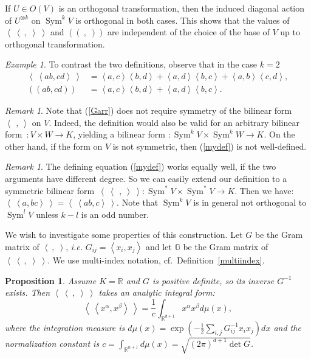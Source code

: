 \documentclass{amsart}
\DeclareMathOperator{\Sym}{Sym}
\newcommand{\ie}{{\it i.e. }}
\newcommand{\bra}{\left<\!\!\!\:\left<}
\newcommand{\ket}{\right>\!\!\!\:\right>}
\newcommand{\G}{\mathbb{G}}
\newcommand{\R}{\mathbb{R}}
\theoremstyle{plain}
\newtheorem{proposition}[theorem]{Proposition}
\theoremstyle{definition}
\theoremstyle{remark}
\newtheorem{remark}[theorem]{Remark}
\newtheorem{example}[theorem]{Example}
\begin{document}
If $U\in O(V)$ is an orthogonal transformation, then the induced diagonal action of $U^{\otimes k}$ on $\Sym^kV$ is orthogonal in both cases. This shows that the values of $\bra\ ,\;\ket$ and $\left(\!\left(\ ,\;\right)\!\right)$ are independent of the choice of the base of $V$ up to orthogonal transformation. 
\begin{example}
To contrast the two definitions, observe that in the case $k=2$
\begin{align}
\bra ab,cd\ket &= \left<a,c\right>\left<b,d\right>+\left<a,d\right>\left<b,c\right> + \left<a,b\right>\left<c,d\right>, \\
\left(\!\left( ab,cd \right)\!\right) &= \left<a,c\right>\left<b,d\right>+\left<a,d\right>\left<b,c\right>.
\end{align}
\end{example}
\begin{remark}
Note that (\ref{Garr}) does not require symmetry of the bilinear form $\left<\,\ ,\ \right>$ on $V$. Indeed, the definition would also be valid for an arbitrary bilinear form~$: V\times W \rightarrow K$, yielding a bilinear form $:\Sym^kV\times\Sym^kW\rightarrow K$. On the other hand, if the form on $V$ is not symmetric, then (\ref{mydef}) is not well-defined.
\end{remark}
\begin{remark}
The defining equation (\ref{mydef}) works equally well, if the two arguments have different degree. So we can easily extend our definition to a symmetric bilinear form~$\bra\ \,,\ \ket:\Sym^*V\times\Sym^*V \rightarrow K$. Then we have: $\bra a,bc\ket =\bra ab,c\ket$. Note that $\Sym^kV$ is in general not orthogonal to $\Sym^lV$ unless $k-l$ is an odd number.
\end{remark}
We wish to investigate some properties of this construction. Let $G$ be the Gram matrix of $\left< \ ,\;\right>$, \ie $G_{ij} = \left<x_i,x_j\right>$ and
let $\G$ be the Gram matrix of $\bra\ ,\;\ket$. We use multi-index notation, cf.~Definition~\ref{multiindex}.
\begin{proposition} \label{intequiv}Assume $K=\R$ and $G$ is positive definite, so its inverse $G^{-1} $ exists. Then $\bra\ ,\;\ket$ takes an analytic integral form:
\begin{equation*}
\bra x^\alpha, x^\beta \ket = \frac{1}{c}\int_{\R^{d+1}} x^\alpha x^\beta d\mu(x),
\end{equation*}
where the integration measure is $d\mu(x) = \exp\left(-\frac{1}{2}\sum_{i,j} G^{-1}_{ij}x_ix_j\right)dx$ and the normalization constant is $c=\int_{\R^{n+1}} d\mu(x)=\sqrt{(2\pi)^{d+1}\det G}$.
\end{proposition}
\end{document}

